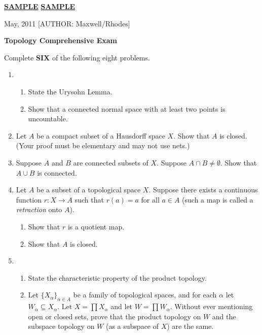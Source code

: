 \documentclass[12pt]{article}
\def\ra{\rightarrow}
\begin{document}
\thispagestyle{empty}
\Large \noindent \underline{\textbf{SAMPLE}} \hfill\underline{\textbf{SAMPLE}}

\scriptsize {} May, 2011  \hfill  \tiny [AUTHOR: Maxwell/Rhodes]
\normalsize\bigskip

\centerline{\large\textbf{Topology Comprehensive Exam}} 
\bigskip

Complete {\bf SIX} of the following eight problems.
\bigskip


\begin{enumerate}




\item 
\begin{enumerate}
\item State the Urysohn Lemma.
\item Show that a connected normal space with at least two points is uncountable.
\end{enumerate}

\item Let $A$ be a compact subset of a Hausdorff space $X$.
Show that $A$ is closed. (Your proof must be elementary and may not use
nets.)

\item Suppose $A$ and $B$ are connected subsets of $X$. Suppose $A\cap B\neq \emptyset$.  Show that $A\cup B$ is connected.

\item Let $A$ be a subset of a topological space $X$.  Suppose there exists a continuous function $r:X\ra A$
such that $r(a)=a$ for all $a\in A$ (such a map is called a {\it retraction}
onto $A$).
\begin{enumerate}
\item Show that $r$ is a quotient map.
\item Show that $A$ is closed.
\end{enumerate}

\item 
\begin{enumerate}
\item State the characteristic property of the product topology.
\item Let $\{X_\alpha\}_{\alpha\in A}$ be a family of
topological spaces, and for each $\alpha$ let $W_\alpha\subseteq X_\alpha$. 
Let $X=\prod X_\alpha$ and let $W=\prod W_\alpha$.
Without ever mentioning open or closed sets, prove that 
the product topology on $W$  and the
subspace topology on $W$ (as a subspace of $X$) are the same.
\end{enumerate}	


\end{enumerate}
\end{document}
